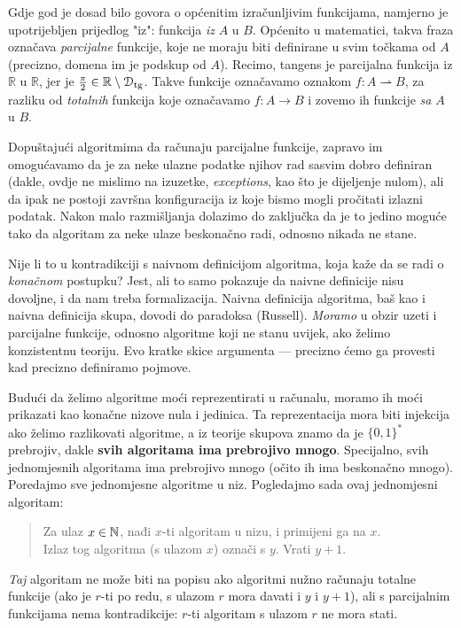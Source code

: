 Gdje god je dosad bilo govora o općenitim izračunljivim funkcijama, namjerno je upotrijebljen prijedlog "iz": funkcija \emph{iz} $A$ u $B$. Općenito u matematici, takva fraza označava \emph{parcijalne} funkcije, koje ne moraju biti definirane u svim točkama od $A$ (precizno, domena im je podskup od $A$). Recimo, tangens je parcijalna funkcija iz $\mathbb R$ u $\mathbb R$, jer je $\frac{\pi}{2}\in\mathbb R\setminus \mathcal D_{\text{tg}}$. Takve funkcije označavamo oznakom $f:A\rightharpoonup B$, za razliku od \emph{totalnih} funkcija koje označavamo $f:A\to B$ i zovemo ih funkcije \emph{sa} $A$ u $B$. 

Dopuštajući algoritmima da računaju parcijalne funkcije, zapravo im omogućavamo da je za neke ulazne podatke njihov rad sasvim dobro definiran (dakle, ovdje ne mislimo na izuzetke, \emph{exceptions}, kao što je dijeljenje nulom), ali da ipak ne postoji završna konfiguracija iz koje bismo mogli pročitati izlazni podatak. Nakon malo razmišljanja dolazimo do zaključka da je to jedino moguće tako da algoritam za neke ulaze beskonačno radi, odnosno nikada ne stane.

Nije li to u kontradikciji s naivnom definicijom algoritma, koja kaže da se radi o \emph{konačnom} postupku? Jest, ali to samo pokazuje da naivne definicije nisu dovoljne, i da nam treba formalizacija. Naivna definicija algoritma, baš kao i naivna definicija skupa, dovodi do paradoksa (Russell). \emph{Moramo} u obzir uzeti i parcijalne funkcije, odnosno algoritme koji ne stanu uvijek, ako želimo konzistentnu teoriju. Evo kratke skice argumenta --- precizno ćemo ga provesti kad precizno definiramo pojmove.

Budući da želimo algoritme moći reprezentirati u računalu, moramo ih moći prikazati kao konačne nizove nula i jedinica. Ta reprezentacija mora biti injekcija ako želimo razlikovati algoritme, a iz teorije skupova znamo da je $\{0,1\}^*$ prebrojiv, dakle \textbf{svih algoritama ima prebrojivo mnogo}. Specijalno, svih jednomjesnih algoritama ima prebrojivo mnogo (očito ih ima beskonačno mnogo). Poredajmo sve jednomjesne algoritme u niz. Pogledajmo sada ovaj jednomjesni algoritam:
\begin{quote}
	Za ulaz $x\in{\mathbb N}$, nađi $x$-ti algoritam u nizu, i primijeni ga na $x$.\\
	Izlaz tog algoritma (s ulazom $x$) označi s $y$. Vrati $y+1$.
\end{quote}
\emph{Taj} algoritam ne može biti na popisu ako algoritmi nužno računaju totalne funkcije (ako je $r$-ti po redu, s ulazom $r$ mora davati i $y$ i $y+1$), ali s parcijalnim funkcijama nema kontradikcije: $r$-ti algoritam s ulazom $r$ ne mora stati.

